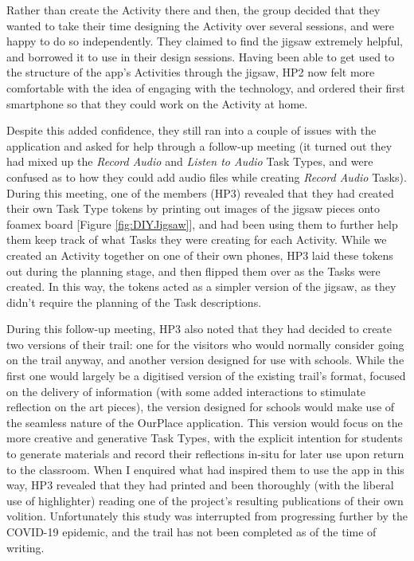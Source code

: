 Rather than create the Activity there and then, the group decided that they wanted to take their time designing the Activity over several sessions, and were happy to do so independently. They claimed to find the jigsaw extremely helpful, and borrowed it to use in their design sessions. Having been able to get used to the structure of the app's Activities through the jigsaw, HP2 now felt more comfortable with the idea of engaging with the technology, and ordered their first smartphone so that they could work on the Activity at home.

Despite this added confidence, they still ran into a couple of issues with the application and asked for help through a follow-up meeting (it turned out they had mixed up the \textit{Record Audio} and \textit{Listen to Audio} Task Types, and were confused as to how they could add audio files while creating \textit{Record Audio} Tasks). During this meeting, one of the members (HP3) revealed that they had created their own Task Type tokens by printing out images of the jigsaw pieces onto foamex board [Figure \ref{fig:DIYJigsaw}], and had been using them to further help them keep track of what Tasks they were creating for each Activity. While we created an Activity together on one of their own phones, HP3 laid these tokens out during the planning stage, and then flipped them over as the Tasks were created. In this way, the tokens acted as a simpler version of the jigsaw, as they didn't require the planning of the Task descriptions.

During this follow-up meeting, HP3 also noted that they had decided to create two versions of their trail: one for the visitors who would normally consider going on the trail anyway, and another version designed for use with schools. While the first one would largely be a digitised version of the existing trail's format, focused on the delivery of information (with some added interactions to stimulate reflection on the art pieces), the version designed for schools would make use of the seamless nature of the OurPlace application. This version would focus on the more creative and generative Task Types, with the explicit intention for students to generate materials and record their reflections in-situ for later use upon return to the classroom. When I enquired what had inspired them to use the app in this way, HP3 revealed that they had printed and been thoroughly (with the liberal use of highlighter) reading one of the project's resulting publications \citep{Richardson2018} of their own volition. Unfortunately this study was interrupted from progressing further by the COVID-19 epidemic, and the trail has not been completed as of the time of writing.

